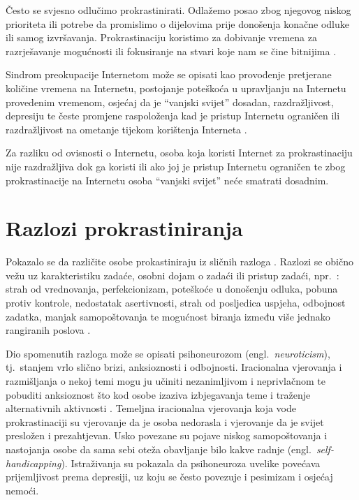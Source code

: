 \documentclass[11pt,english]{article}
\newcommand{\engl}[1]{(engl.~\emph{#1})}
\begin{document}
\begin{multicols}{2}
Često se svjesno odlučimo prokrastinirati. Odlažemo posao zbog njegovog niskog
prioriteta ili potrebe da promislimo o dijelovima prije donošenja konačne odluke
ili samog izvršavanja. Prokrastinaciju koristimo za dobivanje vremena za
razrješavanje mogućnosti ili fokusiranje na stvari koje nam se čine bitnijima
\cite{burka2004procrastination}.

Sindrom preokupacije Internetom može se opisati kao provođenje pretjerane
količine vremena na Internetu, postojanje poteškoća u upravljanju na Internetu provedenim
vremenom, osjećaj da je ``vanjski svijet'' dosadan, razdražljivost, depresiju
te česte promjene raspoloženja kad je pristup Internetu ograničen ili
razdražljivost na ometanje tijekom korištenja Interneta
\cite{yellowlees2007problematic}.
 
Za razliku od ovisnosti o Internetu, osoba koja koristi Internet za
prokrastinaciju nije razdražljiva dok ga koristi ili ako joj je pristup
Internetu ograničen te zbog prokrastinacije na Internetu osoba ``vanjski
svijet'' neće smatrati dosadnim.


\section{Razlozi prokrastiniranja}
Pokazalo se da različite osobe prokastiniraju iz sličnih razloga
\cite{steel2007nature}. Razlozi se obično vežu uz karakteristiku zadaće, osobni
dojam o zadaći ili pristup zadaći, npr.~\cite{solomon1984academic}: strah od
vrednovanja, perfekcionizam, poteškoće u donošenju odluka, pobuna protiv
kontrole, nedostatak asertivnosti, strah od posljedica uspjeha, odbojnost
zadatka, manjak samopoštovanja te mogućnost biranja između više jednako
rangiranih poslova \cite{o2001choice}.

Dio spomenutih razloga može se opisati psihoneurozom \engl{neuroticism},
tj.~stanjem vrlo slično brizi, anksioznosti i odbojnosti. Iracionalna vjerovanja
i razmišljanja o nekoj temi mogu ju učiniti nezanimljivom i neprivlačnom te
pobuditi anksioznost što kod osobe izaziva izbjegavanja teme i traženje
alternativnih aktivnosti \cite{steel2007nature}. Temeljna iracionalna
vjerovanja koja vode prokrastinaciji su vjerovanje da je osoba nedorasla i vjerovanje da je svijet
presložen i prezahtjevan. Usko povezane su pojave niskog samopoštovanja i
nastojanja osobe da sama sebi oteža obavljanje bilo kakve radnje
\engl{self-handicapping}. Istraživanja \cite{Caballero95neuro, Saklofske95neuro}
su pokazala da psihoneuroza uvelike povećava prijemljivost prema depresiji, uz
koju se često povezuje i pesimizam i osjećaj nemoći.


\end{multicols}
\end{document}
